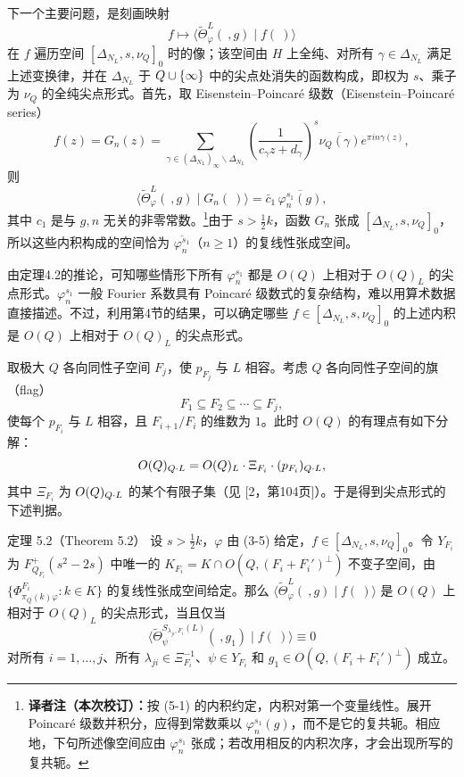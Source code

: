 下一个主要问题，是刻画映射
\[
 f\longmapsto\langle\widetilde\Theta_\varphi^L(\ ,g)\mid f(\ )\rangle
\]
在 $f$ 遍历空间 $[\Delta_{N_L},s,\nu_Q]_0$ 时的像；该空间由 $H$ 上全纯、对所有 $\gamma\in\Delta_{N_L}$ 满足上述变换律，并在 $\Delta_{N_L}$ 于 $Q\cup\{\infty\}$ 中的尖点处消失的函数构成，即权为 $s$、乘子为 $\nu_Q$ 的全纯尖点形式。首先，取 Eisenstein--Poincaré 级数（Eisenstein--Poincaré series）
\[
 f(z)=G_n(z)=\sum_{\gamma\in(\Delta_{N_L})_\infty\backslash\Delta_{N_L}}
 \left(\frac1{c_\gamma z+d_\gamma}\right)^s
 \overline{\nu_Q(\gamma)}e^{\pi in\gamma(z)},
\]
则
\[
 \langle\widetilde\Theta_\varphi^L(\ ,g)\mid G_n(\ )\rangle
 =\bar c_1\,\overline{\varphi_n^{s_1}(g)},
\]
其中 $c_1$ 是与 $g,n$ 无关的非零常数。\footnote{\textbf{译者注（本次校订）：}按 (5-1) 的内积约定，内积对第一个变量线性。展开 Poincaré 级数并积分，应得到常数乘以 $\varphi_n^{s_1}(g)$，而不是它的复共轭。相应地，下句所述像空间应由 $\varphi_n^{s_1}$ 张成；若改用相反的内积次序，才会出现所写的复共轭。}由于 $s>\tfrac12k$，函数 $G_n$ 张成 $[\Delta_{N_L},s,\nu_Q]_0$，所以这些内积构成的空间恰为 $\overline{\varphi_n^{s_1}}$（$n\ge1$）的复线性张成空间。

由定理4.2的推论，可知哪些情形下所有 $\varphi_n^{s_1}$ 都是 $O(Q)$ 上相对于 $O(Q)_L$ 的尖点形式。$\varphi_n^{s_1}$ 一般 Fourier 系数具有 Poincaré 级数式的复杂结构，难以用算术数据直接描述。不过，利用第4节的结果，可以确定哪些 $f\in[\Delta_{N_L},s,\nu_Q]_0$ 的上述内积是 $O(Q)$ 上相对于 $O(Q)_L$ 的尖点形式。

取极大 $Q$ 各向同性子空间 $F_j$，使 $p_{F_j}$ 与 $L$ 相容。考虑 $Q$ 各向同性子空间的旗（flag）
\[
 F_1\subseteq F_2\subseteq\cdots\subseteq F_j,
\]
使每个 $p_{F_i}$ 与 $L$ 相容，且 $F_{i+1}/F_i$ 的维数为 $1$。此时 $O(Q)$ 的有理点有如下分解：
\[
 O(Q)_{Q\cdot L}=O(Q)_L\cdot\Xi_{F_i}\cdot(p_{F_i})_{Q\cdot L},
\]
其中 $\Xi_{F_i}$ 为 $O(Q)_{Q\cdot L}$ 的某个有限子集（见 [2，第104页]）。于是得到尖点形式的下述判据。
\begin{originaltheorem}{定理 5.2（Theorem 5.2）}
设 $s>\tfrac12k$，$\varphi$ 由 (3-5) 给定，$f\in[\Delta_{N_L},s,\nu_Q]_0$。令 $Y_{F_i}$ 为
$F_{Q_{F_i}}^+(s^2-2s)$ 中唯一的
$K_{F_i}=K\cap O(Q,(F_i+F_i')^\perp)$ 不变子空间，由
$\{\Phi_{\pi_Q(k)\varphi}^{F_i}:k\in K\}$ 的复线性张成空间给定。那么
$\langle\widetilde\Theta_\varphi^L(\ ,g)\mid f(\ )\rangle$ 是 $O(Q)$ 上相对于 $O(Q)_L$ 的尖点形式，当且仅当
\begin{equation}
 \langle\widetilde\Theta_\psi^{S_{\lambda_{ji},F_i}(L)}(\ ,g_1)\mid f(\ )\rangle\equiv0\tag{5-3}
\end{equation}
对所有 $i=1,\ldots,j$、所有 $\lambda_{ji}\in\Xi_{F_i}^{-1}$、$\psi\in Y_{F_i}$ 和
$g_1\in O(Q,(F_i+F_i')^\perp)$ 成立。
\end{originaltheorem}

